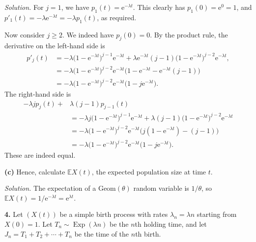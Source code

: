 \documentclass[
  a4paper,
]{article}
\theoremstyle{definition}
\theoremstyle{definition}
\theoremstyle{definition}
\theoremstyle{remark}
\begin{document}
\begin{myanswers}
\emph{Solution.}
For \(j = 1\), we have \(p_1(t) = \mathrm{e}^{-\lambda t}\). This clearly has \(p_1(0) = \mathrm{e}^0 = 1\), and \(p'_1(t) = -\lambda \mathrm{e}^{-\lambda t} = -\lambda p_1(t)\), as required.

Now consider \(j \geq 2\). We indeed have \(p_j(0) = 0\). By the product rule, the derivative on the left-hand side is
\begin{align*}
    p'_j(t) &=  -\lambda \big(1 - \mathrm{e}^{-\lambda t}\big)^{j-1}\mathrm{e}^{-\lambda t} + \lambda \mathrm{e}^{-\lambda t} (j-1) \big(1 - \mathrm{e}^{-\lambda t}\big)^{j-2}\mathrm{e}^{-\lambda t} ,    \\
    &= -\lambda \big(1 - \mathrm{e}^{-\lambda t}\big)^{j-2}\mathrm{e}^{-\lambda t} \big(1 - \mathrm{e}^{-\lambda t} -\mathrm{e}^{-\lambda t} (j-1) \big) \\
    &=- \lambda \big(1 - \mathrm{e}^{-\lambda t}\big)^{j-2}\mathrm{e}^{-\lambda t} \big(1 - j \mathrm{e}^{-\lambda t}  \big).
     \end{align*}
The right-hand side is
\begin{align*}
    -\lambda j p_j(t) + {}&\lambda (j-1)p_{j-1}(t) \\
    &= - \lambda j \big(1 - \mathrm{e}^{-\lambda t}\big)^{j-1}\mathrm{e}^{-\lambda t} + \lambda (j-1) \big(1 - \mathrm{e}^{-\lambda t}\big)^{j-2}\mathrm{e}^{-\lambda t} \\
    &= -\lambda\big(1 - \mathrm{e}^{-\lambda t}\big)^{j-2}\mathrm{e}^{-\lambda t}\big(j(1 - \mathrm{e}^{-\lambda t}) - (j-1)\big) \\
    &= - \lambda \big(1 - \mathrm{e}^{-\lambda t}\big)^{j-2}\mathrm{e}^{-\lambda t} \big(1 - j \mathrm{e}^{-\lambda t}  \big) .
    \end{align*}
These are indeed equal.

\end{myanswers}

\textbf{(c)} Hence, calculate \(\mathbb E X(t)\), the expected population size at time \(t\).

\begin{myanswers}
\emph{Solution.}
The expectation of a \(\text{Geom}(\theta)\) random variable is \(1/\theta\), so \(\mathbb EX(t) = 1/\mathrm{e}^{-\lambda t} = \mathrm{e}^{\lambda t}\).

\end{myanswers}

\textbf{4.} Let \((X(t))\) be a simple birth process with rates \(\lambda_n = \lambda n\) starting from \(X(0)=1\). Let \(T_n \sim \operatorname{Exp}(\lambda n)\) be the \(n\)th holding time, and let \(J_n = T_1 + T_2 +\cdots+T_n\) be the time of the \(n\)th birth.
\end{document}
